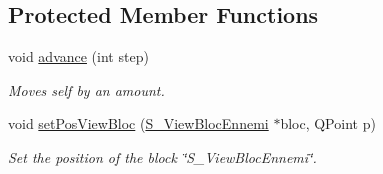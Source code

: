 \subsection*{Protected Member Functions}
\begin{DoxyCompactItemize}
\item 
void \hyperlink{class_ennemi_a68785ba49227d8588b0acc1fcc9856fa}{advance} (int step)
\begin{DoxyCompactList}\small\item\em Moves self by an amount. \end{DoxyCompactList}\item 
void \hyperlink{class_ennemi_a029f6711fe3817f9697a8369718e50f6}{set\+Pos\+View\+Bloc} (\hyperlink{class_s___view_bloc_ennemi}{S\+\_\+\+View\+Bloc\+Ennemi} $\ast$bloc, Q\+Point p)
\begin{DoxyCompactList}\small\item\em Set the position of the block \char`\"{}\+S\+\_\+\+View\+Bloc\+Ennemi\char`\"{}. \end{DoxyCompactList}\end{DoxyCompactItemize}
